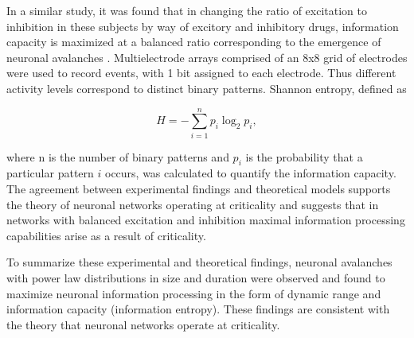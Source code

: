 \documentclass[12pt]{article}
\begin{document}
In a similar study, it was found that in changing the ratio of excitation to inhibition in these subjects by way of excitory and inhibitory drugs, information capacity is maximized at a balanced ratio corresponding to the emergence of neuronal avalanches \cite{Shew2011a}. Multielectrode arrays comprised of an 8x8 grid of electrodes were used to record events, with 1 bit assigned to each electrode. Thus different activity levels correspond to distinct binary patterns. Shannon entropy, defined as

\begin{equation}
H = - \sum^{n}_{i=1}p_{i}\log_{2}p_{i},
\end{equation}

\noindent where n is the number of binary patterns and $ p_{i} $ is the probability that a particular pattern $i$ occurs, was calculated to quantify the information capacity. The agreement between experimental findings and theoretical models supports the theory of neuronal networks operating at criticality and suggests that in networks with balanced excitation and inhibition maximal information processing capabilities arise as a result of criticality. 

To summarize these experimental and theoretical findings, neuronal avalanches with power law distributions in size and duration were observed and found to maximize neuronal information processing in the form of dynamic range and information capacity (information entropy). These findings are consistent with the theory that neuronal networks operate at criticality. 
\end{document}
